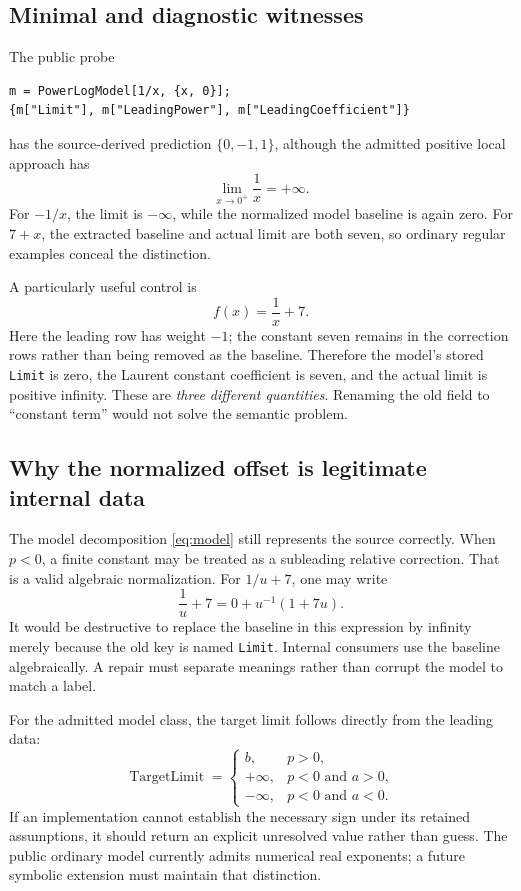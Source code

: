 \documentclass[11pt,letterpaper]{article}
\newcommand{\code}[1]{\nolinkurl{#1}}
\begin{document}
\subsection{Minimal and diagnostic witnesses}
The public probe
\par\noindent\begin{minipage}{\linewidth}
\begin{lstlisting}
m = PowerLogModel[1/x, {x, 0}];
{m["Limit"], m["LeadingPower"], m["LeadingCoefficient"]}
\end{lstlisting}
\end{minipage}\par
has the source-derived prediction \(\{0,-1,1\}\), although the admitted positive local approach has
\[
 \lim_{x\to0^+}\frac1x=+\infty.
\]
For \(-1/x\), the limit is \(-\infty\), while the normalized model baseline is again zero. For \(7+x\), the extracted baseline and actual limit are both seven, so ordinary regular examples conceal the distinction.

A particularly useful control is
\[
 f(x)=\frac1x+7.
\]
Here the leading row has weight \(-1\); the constant seven remains in the correction rows rather than being removed as the baseline. Therefore the model's stored \code{Limit} is zero, the Laurent constant coefficient is seven, and the actual limit is positive infinity. These are \emph{three different quantities}. Renaming the old field to ``constant term'' would not solve the semantic problem.

\subsection{Why the normalized offset is legitimate internal data}
The model decomposition \eqref{eq:model} still represents the source correctly. When \(p<0\), a finite constant may be treated as a subleading relative correction. That is a valid algebraic normalization. For \(1/u+7\), one may write
\[
 \frac1u+7=0+u^{-1}(1+7u).
\]
It would be destructive to replace the baseline in this expression by infinity merely because the old key is named \code{Limit}. Internal consumers use the baseline algebraically. A repair must separate meanings rather than corrupt the model to match a label.

For the admitted model class, the target limit follows directly from the leading data:
\begin{equation}
 \operatorname{TargetLimit}=\begin{cases}
 b,&p>0,\\
 +\infty,&p<0\text{ and }a>0,\\
 -\infty,&p<0\text{ and }a<0.
 \end{cases}
 \label{eq:targetlimit}
\end{equation}
If an implementation cannot establish the necessary sign under its retained assumptions, it should return an explicit unresolved value rather than guess. The public ordinary model currently admits numerical real exponents; a future symbolic extension must maintain that distinction.
\end{document}
